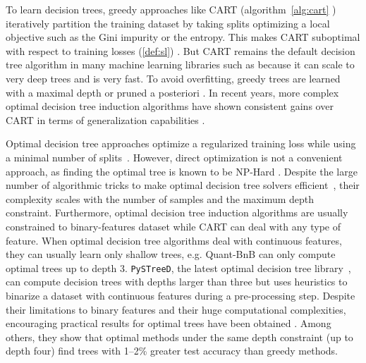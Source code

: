 To learn decision trees, greedy approaches like CART (algorithm~\ref{alg:cart} \cite{breiman1984classification}) iteratively partition the training dataset by taking splits optimizing a local objective such as the Gini impurity or the entropy. 
This makes CART suboptimal with respect to training losses (\ref{def:sl}) \cite{Murthy}. 
But CART remains the default decision tree algorithm in many machine learning libraries such as \cite{scikit-learn,xgb,ke2017lightgbm,9533597} because it can scale to very deep trees and is very fast.
To avoid overfitting, greedy trees are learned with a maximal depth or pruned a posteriori \cite[chapter 3]{breiman1984classification}. 
In recent years, more complex optimal decision tree induction algorithms have shown consistent gains over CART in terms of generalization capabilities \cite{oct,verwer2017learning,murtree}.

Optimal decision tree approaches optimize a regularized training loss while using a minimal number of splits~\cite{oct,mfoct,binoct,quantbnb,murtree,blossom,pystreed,chaouki2024branchesfastdynamicprogramming}.
However, direct optimization is not a convenient approach, as finding the optimal tree is known to be NP-Hard \cite{npcomplete}. Despite the large number of algorithmic tricks to make optimal decision tree solvers efficient~\cite{murtree,quantbnb}, their complexity scales with the number of samples and the maximum depth constraint.
Furthermore, optimal decision tree induction algorithms are usually constrained to binary-features dataset while CART can deal with any type of feature. When optimal decision tree algorithms deal with continuous features, they can usually learn only shallow trees, e.g. Quant-BnB \cite{quantbnb} can only compute optimal trees up to depth 3.
\texttt{PySTreeD}, the latest optimal decision tree library~\cite{pystreed}, can compute decision trees with depths larger than three but uses heuristics to binarize a dataset with continuous features during a pre-processing step. %
Despite their limitations to binary features and their huge computational complexities, encouraging practical results for optimal trees have been obtained \cite{how-eff,lin2020generalized,costa2023recent,vanderlinden2024optimalgreedydecisiontrees}.
Among others, they show that optimal methods under the same depth constraint (up to depth four) find
trees with 1--2\% greater test accuracy than greedy methods.

